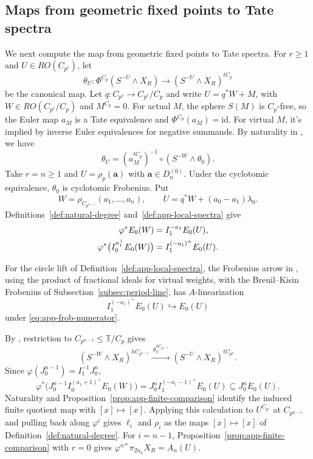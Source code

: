 \subsection{Maps from geometric fixed points to Tate spectra}

We next compute the map from geometric fixed points to Tate spectra.
For $r\ge1$ and $U\in RO(C_{p^r})$, let
\[
\theta_U:
\Phi^{C_p}(S^{-U}\wedge X_R)
\longrightarrow (S^{-U}\wedge X_R)^{tC_p}
\]
be the canonical map. Let
$q:C_{p^r}\to C_{p^r}/C_p$ and write
$U=q^*W+M$, with $W\in RO(C_{p^r}/C_p)$ and $M^{C_p}=0$.
For actual $M$, the sphere $S(M)$ is $C_p$-free, so the Euler map
$a_M$ is a Tate equivalence and $\Phi^{C_p}(a_M)=\mathrm{id}$.
For virtual $M$, it's implied by inverse Euler equivalences for negative summands.
By naturality in \cite[Lemma~II.4.5]{NS}, we have
\begin{equation}\label{eq:app-moving-arrow}
\theta_U=(a_M^{tC_p})^{-1}\circ(S^{-W}\wedge\theta_0).
\end{equation}
Take $r=n\ge1$ and
$U=\rho_p(\mathbf a)$ with $\mathbf a\in D_n^{(0)}$.
Under the cyclotomic equivalence, $\theta_0$ is cyclotomic
Frobenius. Put
\[
W=\rho_{C_{p^{n-1}}}(a_1,\ldots,a_n),
\qquad U=q^*W+(a_0-a_1)\lambda_0.
\]
Definitions~\ref{def:natural-degree}
and~\ref{def:app-local-spectra} give
\begin{align}
\varphi^*E_0(W)
  &=I_1^{-a_1}E_0(U),\notag\\
\varphi^*\bigl(I_0^{a_1^+}E_0(W)\bigr)
  &=I_1^{(-a_1)^+}E_0(U).
\label{eq:app-frob-numerator}
\end{align}

For the circle lift of Definition~\ref{def:app-local-spectra},
the Frobenius arrow in \cite[Theorem~1.9, Notation~3.14 and Example~3.15]{SulymaNew},
using the product of fractional ideals for virtual weights,
with the Breuil--Kisin Frobenius of Subsection~\ref{subsec:period-line},
has $A$-linearization
\[
I_1^{(-a_1)^+}E_0(U)\hookrightarrow E_0(U)
\]
under \eqref{eq:app-frob-numerator}.

By \cite[Lemma~II.4.1]{NS}, restriction to
$C_{p^{n-1}}\le\mathbb T/C_p$ gives
\[
(S^{-W}\wedge X_R)^{hC_{p^{n-1}}}
\xrightarrow{\ \theta_U^{hC_{p^{n-1}}}\ }
(S^{-U}\wedge X_R)^{tC_{p^n}}.
\]
Since $\varphi(J_0^{n-1})=I_1^{-1}J_0^n$,
\begin{equation}\label{eq:app-frob-denominator}
\varphi^*\bigl(J_0^{n-1}I_0^{(a_1+1)^+}E_0(W)\bigr)
=J_0^n I_1^{(-a_1-1)^+}E_0(U)
\subseteq J_0^nE_0(U).
\end{equation}
Naturality and Proposition~\ref{prop:app-finite-comparison}
identify the induced finite quotient map with $[x]\mapsto[x]$.
Applying this calculation to $U^{C_{p^i}}$ at $C_{p^{n-i}}$
and pulling back along $\varphi^i$ gives $\ell_i$ and $\rho_i$
as the maps $[x]\mapsto[x]$ of Definition~\ref{def:natural-degree}.
For $i=n-1$, Proposition~\ref{prop:app-finite-comparison}
with $r=0$ gives
$\varphi^{n*}\pi_{2a_n}X_R=A_n(U)$.

